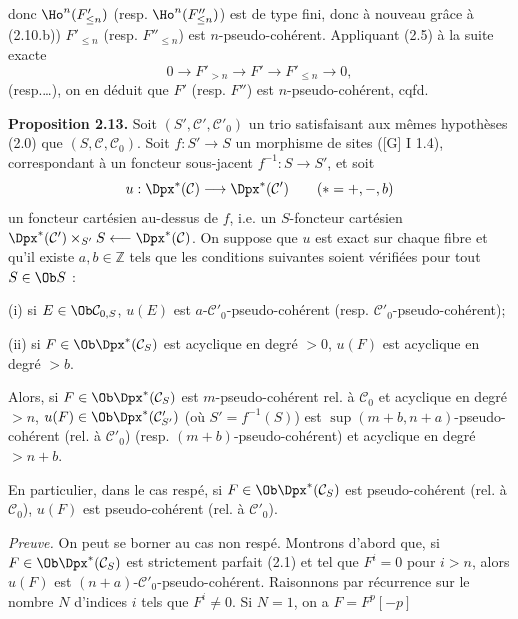 donc \(\Ho^n(F'_{\leq n})\) (resp. \(\Ho^n(F''_{\leq n})\)) est de type fini, donc à nouveau grâce à (2.10.b)) \(F'_{\leq n}\) (resp. \(F''_{\leq n}\)) est \(n\)-pseudo-cohérent. Appliquant (2.5) à la suite exacte
\[
  0\longrightarrow F'_{>n}\longrightarrow F'\longrightarrow F'_{\leq n}\longrightarrow 0,
\]
(resp.\dots), on en déduit que \(F'\) (resp. \(F''\)) est \(n\)-pseudo-cohérent, cqfd.

\textbf{Proposition 2.13.} Soit \((S',\mathcal C',\mathcal C'_0)\) un trio satisfaisant aux mêmes hypothèses (2.0) que \((S,\mathcal C,\mathcal C_0)\). Soit \(f:S'\to S\) un morphisme de sites ([G] I 1.4), correspondant à un foncteur sous-jacent \(f^{-1}:S\to S'\), et soit
\[
  u:\Dpx^*(\mathcal C)\longrightarrow \Dpx^*(\mathcal C')\qquad (*=+,-,b)
\]
un foncteur cartésien au-dessus de \(f\), i.e. un \(S\)-foncteur cartésien \(\Dpx^*(\mathcal C')\times_{S'}S\longleftarrow\Dpx^*(\mathcal C)\). On suppose que \(u\) est exact sur chaque fibre et qu'il existe \(a,b\in\mathbb Z\) tels que les conditions suivantes soient vérifiées pour tout \(S\in\Ob S\) :

(i) si \(E\in\Ob\mathcal C_{0,S}\), \(u(E)\) est \(a\)-\(\mathcal C'_0\)-pseudo-cohérent (resp. \(\mathcal C'_0\)-pseudo-cohérent);

(ii) si \(F\in\Ob\Dpx^*(\mathcal C_S)\) est acyclique en degré \(>0\), \(u(F)\) est acyclique en degré \(>b\).

Alors, si \(F\in\Ob\Dpx^*(\mathcal C_S)\) est \(m\)-pseudo-cohérent rel. à \(\mathcal C_0\) et acyclique en degré \(>n\), \(u(F)\in\Ob\Dpx^*(\mathcal C'_{S'})\) (où \(S'=f^{-1}(S)\)) est \(\sup(m+b,n+a)\)-pseudo-cohérent (rel. à \(\mathcal C'_0\)) (resp. \((m+b)\)-pseudo-cohérent) et acyclique en degré \(>n+b\).

En particulier, dans le cas respé, si \(F\in\Ob\Dpx^*(\mathcal C_S)\) est pseudo-cohérent (rel. à \(\mathcal C_0\)), \(u(F)\) est pseudo-cohérent (rel. à \(\mathcal C'_0\)).

\emph{Preuve.} On peut se borner au cas non respé. Montrons d'abord que, si \(F\in\Ob\Dpx^*(\mathcal C_S)\) est strictement parfait (2.1) et tel que \(F^i=0\) pour \(i>n\), alors \(u(F)\) est \((n+a)\)-\(\mathcal C'_0\)-pseudo-cohérent. Raisonnons par récurrence sur le nombre \(N\) d'indices \(i\) tels que \(F^i\neq0\). Si \(N=1\), on a \(F=F^p[-p]\)
